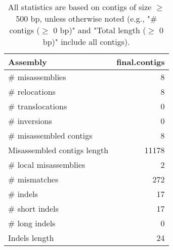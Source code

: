 \documentclass[12pt,a4paper]{article}
\begin{document}
\begin{table}[ht]
\begin{center}
\caption{All statistics are based on contigs of size $\geq$ 500 bp, unless otherwise noted (e.g., "\# contigs ($\geq$ 0 bp)" and "Total length ($\geq$ 0 bp)" include all contigs).}
\begin{tabular}{|l*{1}{|r}|}
\hline
Assembly & final.contigs \\ \hline
\# misassemblies & 8 \\ \hline
\hspace{5mm}\# relocations & 8 \\ \hline
\hspace{5mm}\# translocations & 0 \\ \hline
\hspace{5mm}\# inversions & 0 \\ \hline
\# misassembled contigs & 8 \\ \hline
Misassembled contigs length & 11178 \\ \hline
\# local misassemblies & 2 \\ \hline
\# mismatches & 272 \\ \hline
\# indels & 17 \\ \hline
\hspace{5mm}\# short indels & 17 \\ \hline
\hspace{5mm}\# long indels & 0 \\ \hline
Indels length & 24 \\ \hline
\end{tabular}
\end{center}
\end{table}
\end{document}
